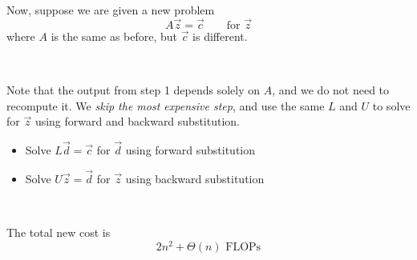 \begin{remark}
    Now, suppose we are given a new problem \[
        A \vec{z} = \vec{c} \qquad \text{for } \vec{z}
    \] where \( A \) is the same as before, but \( \vec{c} \) is different.

        {~~~}

    Note that the output from step 1 depends solely on \( A \), and we do not need to recompute it. We \textit{skip the most expensive step}, and use the same \( L \) and \( U \) to solve for \( \vec{z} \) using forward and backward substitution.

    \begin{itemize}
        \item Solve \( L \vec{d} = \vec{c} \) for \( \vec{d} \) using forward substitution
        \item Solve \( U \vec{z} = \vec{d} \) for \( \vec{z} \) using backward substitution
    \end{itemize}

    {~~~}

    The total new cost is \[
        2n^2 + \Theta(n) \text{ FLOPs}
    \]
\end{remark}

